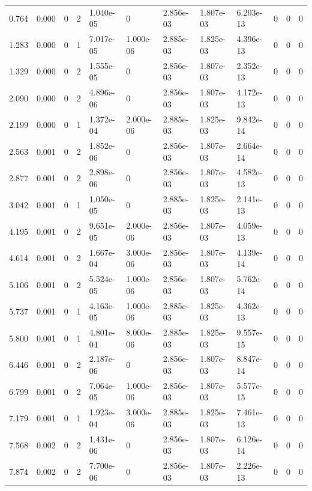 \documentclass[preview]{standalone}
\begin{document}
{{\begin{tabular}{L{1.2cm}C{1.2cm} C{0.3cm}C{0.5cm} C{1.4cm}C{1.4cm} C{1.4cm}C{1.4cm} C{1.6cm}C{1.6cm} C{1.6cm}C{1.6cm}}
  0.764  &  0.000  & 0     &  2 &  1.040e-05  & 0  &  2.856e-03&   1.807e-03& 6.203e-13 & 0   &  0 & 0  \\ 
  1.283  &  0.000  & 0     &  1 &  7.017e-05  & 1.000e-06  &  2.885e-03&   1.825e-03& 4.396e-13 & 0   &  0 & 0  \\ 
  1.329  &  0.000  & 0     &  2 &  1.555e-05  & 0  &  2.856e-03&   1.807e-03& 2.352e-13 & 0   &  0 & 0  \\ 
  2.090  &  0.000  & 0     &  2 &  4.896e-06  & 0  &  2.856e-03&   1.807e-03& 4.172e-13 & 0   &  0 & 0  \\ 
  2.199  &  0.000  & 0     &  1 &  1.372e-04  & 2.000e-06  &  2.885e-03&   1.825e-03& 9.842e-14 & 0   &  0 & 0  \\ 
  2.563  &  0.001  & 0     &  2 &  1.852e-06  & 0  &  2.856e-03&   1.807e-03& 2.664e-14 & 0   &  0 & 0  \\ 
  2.877  &  0.001  & 0     &  2 &  2.898e-06  & 0  &  2.856e-03&   1.807e-03& 4.582e-13 & 0   &  0 & 0  \\ 
  3.042  &  0.001  & 0     &  1 &  1.050e-05  & 0  &  2.885e-03&   1.825e-03& 2.141e-13 & 0   &  0 & 0  \\ 
  4.195  &  0.001  & 0     &  2 &  9.651e-05  & 2.000e-06  &  2.856e-03&   1.807e-03& 4.059e-13 & 0   &  0 & 0  \\ 
  4.614  &  0.001  & 0     &  2 &  1.667e-04  & 3.000e-06  &  2.856e-03&   1.807e-03& 4.139e-14 & 0   &  0 & 0  \\ 
  5.106  &  0.001  & 0     &  2 &  5.524e-05  & 1.000e-06  &  2.856e-03&   1.807e-03& 5.762e-14 & 0   &  0 & 0  \\ 
  5.737  &  0.001  & 0     &  1 &  4.163e-05  & 1.000e-06  &  2.885e-03&   1.825e-03& 4.362e-13 & 0   &  0 & 0  \\ 
  5.800  &  0.001  & 0     &  1 &  4.801e-04  & 8.000e-06  &  2.885e-03&   1.825e-03& 9.557e-15 & 0   &  0 & 0  \\ 
  6.446  &  0.001  & 0     &  2 &  2.187e-06  & 0  &  2.856e-03&   1.807e-03& 8.847e-14 & 0   &  0 & 0  \\ 
  6.799  &  0.001  & 0     &  2 &  7.064e-05  & 1.000e-06  &  2.856e-03&   1.807e-03& 5.577e-15 & 0   &  0 & 0  \\ 
  7.179  &  0.001  & 0     &  1 &  1.923e-04  & 3.000e-06  &  2.885e-03&   1.825e-03& 7.461e-13 & 0   &  0 & 0  \\ 
  7.568  &  0.002  & 0     &  2 &  1.431e-06  & 0  &  2.856e-03&   1.807e-03& 6.126e-14 & 0   &  0 & 0  \\ 
  7.874  &  0.002  & 0     &  2 &  7.700e-06  & 0  &  2.856e-03&   1.807e-03& 2.226e-13 & 0   &  0 & 0  \\ 

\end{tabular}}}
\end{document}
